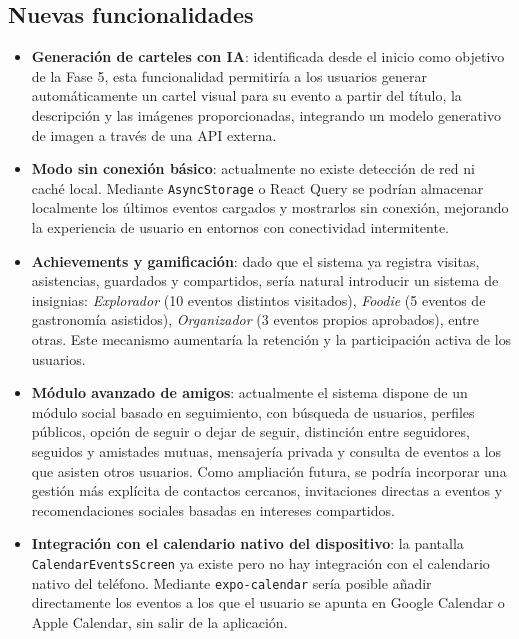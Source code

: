 \subsection{Nuevas funcionalidades}

\begin{itemize}
    \item \textbf{Generación de carteles con IA}: identificada desde el inicio como objetivo de la Fase 5, esta funcionalidad permitiría a los usuarios generar automáticamente un cartel visual para su evento a partir del título, la descripción y las imágenes proporcionadas, integrando un modelo generativo de imagen a través de una API externa.

    \item \textbf{Modo sin conexión básico}: actualmente no existe detección de red ni caché local. Mediante \texttt{AsyncStorage} o React Query se podrían almacenar localmente los últimos eventos cargados y mostrarlos sin conexión, mejorando la experiencia de usuario en entornos con conectividad intermitente.

    \item \textbf{Achievements y gamificación}: dado que el sistema ya registra visitas, asistencias, guardados y compartidos, sería natural introducir un sistema de insignias: \textit{Explorador} (10 eventos distintos visitados), \textit{Foodie} (5 eventos de gastronomía asistidos), \textit{Organizador} (3 eventos propios aprobados), entre otras. Este mecanismo aumentaría la retención y la participación activa de los usuarios.

    \item \textbf{Módulo avanzado de amigos}: actualmente el sistema dispone de un módulo social basado en seguimiento, con búsqueda de usuarios, perfiles públicos, opción de seguir o dejar de seguir, distinción entre seguidores, seguidos y amistades mutuas, mensajería privada y consulta de eventos a los que asisten otros usuarios. Como ampliación futura, se podría incorporar una gestión más explícita de contactos cercanos, invitaciones directas a eventos y recomendaciones sociales basadas en intereses compartidos.

    \item \textbf{Integración con el calendario nativo del dispositivo}: la pantalla \texttt{CalendarEventsScreen} ya existe pero no hay integración con el calendario nativo del teléfono. Mediante \texttt{expo-calendar} sería posible añadir directamente los eventos a los que el usuario se apunta en Google Calendar o Apple Calendar, sin salir de la aplicación.


\end{itemize}
